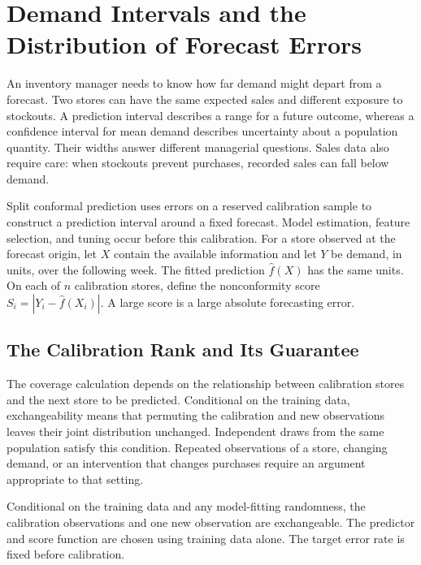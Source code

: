 \hypertarget{M07-demand-intervals-and-the-distribution-of-forecast-errors}{%
\section{Demand Intervals and the Distribution of Forecast
Errors}\label{M07-demand-intervals-and-the-distribution-of-forecast-errors}}

\noindent \noindent An inventory manager needs to know how far demand might depart
from a forecast. Two stores can have the same expected sales and
different exposure to stockouts. A prediction interval describes a range
for a future outcome, whereas a confidence interval for mean demand
describes uncertainty about a population quantity. Their widths answer
different managerial questions. Sales data also require care: when
stockouts prevent purchases, recorded sales can fall below demand.

Split conformal prediction uses errors on a reserved calibration sample
to construct a prediction interval around a fixed forecast. Model
estimation, feature selection, and tuning occur before this calibration.
For a store observed at the forecast origin, let \(X\) contain the
available information and let \(Y\) be demand, in units, over the
following week. The fitted prediction \(\widehat f(X)\) has the same
units. On each of \(n\) calibration stores, define the nonconformity
score \(S_i=|Y_i-\widehat f(X_i)|\). A large score is a large absolute
forecasting error.

\hypertarget{M07-the-calibration-rank-and-its-guarantee}{%
\subsection{The Calibration Rank and Its
Guarantee}\label{M07-the-calibration-rank-and-its-guarantee}}

\noindent \noindent The coverage calculation depends on the relationship between
calibration stores and the next store to be predicted. Conditional on
the training data, exchangeability means that permuting the calibration
and new observations leaves their joint distribution unchanged.
Independent draws from the same population satisfy this condition.
Repeated observations of a store, changing demand, or an intervention
that changes purchases require an argument appropriate to that setting.

\begin{assumption}\label{ass:conformal-exchangeability}
Conditional on the training data and any model-fitting randomness, the calibration observations and one new observation are exchangeable. The predictor and score function are chosen using training data alone. The target error rate is fixed before calibration.
\end{assumption}

